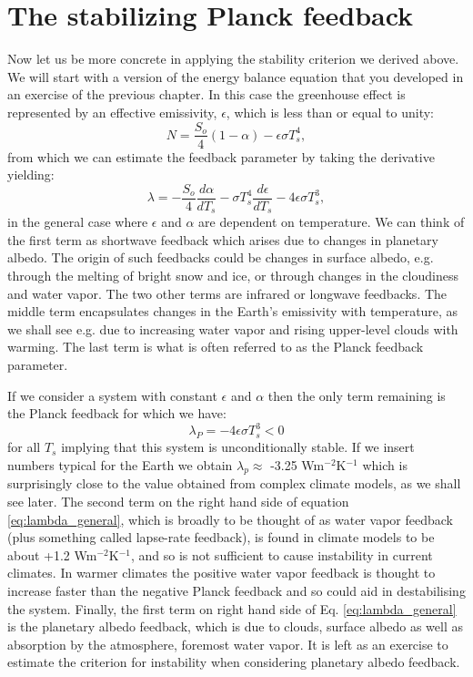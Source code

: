 \documentclass[12pt]{book}
\begin{document}
\section{The stabilizing Planck feedback}
Now let us be more concrete in applying the stability criterion we derived above. We will start with a version of the energy balance equation that you developed in an exercise of the previous chapter. In this case the greenhouse effect is represented by an effective emissivity, $\epsilon$, which is less than or equal to unity:
\begin{equation}
N = \frac{S_o}{4}(1-\alpha) - \epsilon \sigma T_s^4,
\end{equation}
from which we can estimate the feedback parameter by taking the derivative yielding:
\begin{equation}
\lambda = -\frac{S_o}{4}\frac{d\alpha}{dT_s} - \sigma T_s^4 \frac{d\epsilon}{dT_s} - 4 \epsilon \sigma T_s^3,
\label{eq:lambda_general}
\end{equation}
in the general case where $\epsilon$ and $\alpha$ are dependent on temperature. We can think of the first term as shortwave feedback which arises due to changes in planetary albedo. The origin of such feedbacks could be changes in surface albedo, e.g. through the melting of bright snow and ice, or through changes in the cloudiness and water vapor. The two other terms are infrared or longwave feedbacks. The middle term encapsulates changes in the Earth's emissivity with temperature, as we shall see e.g. due to increasing water vapor and rising upper-level clouds with warming. The last term is what is often referred to as the Planck feedback parameter.

If we consider a system with constant $\epsilon$ and $\alpha$ then the only term remaining is the Planck feedback for which we have:
\begin{equation}
\lambda_P = - 4 \epsilon \sigma T_s^3 < 0 
\label{eq:lambda_planck}
\end{equation}
for all $T_s$ implying that this system is unconditionally stable. If we insert numbers typical for the Earth we obtain $\lambda_p \approx$ -3.25 Wm$^{-2}$K$^{-1}$ which is surprisingly close to the value obtained from complex climate models, as we shall see later. The second term on the right hand side of equation \ref{eq:lambda_general}, which is broadly to be thought of as water vapor feedback (plus something called lapse-rate feedback), is found in climate models to be about +1.2 Wm$^{-2}$K$^{-1}$, and so is not sufficient to cause instability in current climates. In warmer climates the positive water vapor feedback is thought to increase faster than the negative Planck feedback and so could aid in destabilising the system. Finally, the first term on right hand side of Eq. \ref{eq:lambda_general} is the planetary albedo feedback, which is due to clouds, surface albedo as well as absorption by the atmosphere, foremost water vapor. It is left as an exercise to estimate the criterion for instability when considering planetary albedo feedback.
\end{document}
